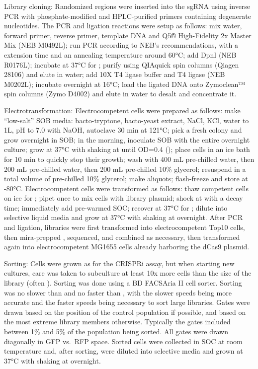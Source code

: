 \documentclass[10pt,oneside]{article}
\begin{document}
Library cloning: Randomized regions were inserted into the sgRNA using inverse PCR with phosphate-modified and HPLC-purified primers containing degenerate nucleotides.  The PCR and ligation reactions were setup as follows: mix  water,   forward primer,   reverse primer,   template DNA and  Q5® High-Fidelity 2x Master Mix (NEB M0492L); run PCR according to NEB's recommendations, with a  extension time and an annealing temperature around 60°C; add   DpnI (NEB R0176L); incubate at 37°C for ; purify using QIAquick spin columns (Qiagen 28106) and elute in  water; add  10X T4 ligase buffer and   T4 ligase (NEB M0202L); incubate overnight at 16°C; load the ligated DNA onto Zymoclean™ spin columns (Zymo D4002) and elute in  water to desalt and concentrate it.

Electrotransformation: Electrocompetent cells were prepared as follows: make ``low-salt'' SOB media:  bacto-tryptone,  bacto-yeast extract,   NaCl,   KCl, water to 1L, pH to 7.0 with NaOH, autoclave 30 min at 121°C; pick a fresh colony and grow overnight in  SOB; in the morning, inoculate  SOB with the entire overnight culture; grow at 37°C with shaking at  until OD=0.4 (); place cells in an ice bath for 10 min to quickly stop their growth; wash with 400 mL pre-chilled water, then 200 mL pre-chilled water, then 200 mL pre-chilled 10\% glycerol; resuspend in a total volume of  pre-chilled 10\% glycerol; make  aliquots; flash-freeze and store at -80°C.  Electrocompetent cells were transformed as follows: thaw competent cells on ice for ; pipet once to mix cells with   library plasmid; shock at  with a  decay time; immediately add  pre-warmed SOC; recover at 37°C for ; dilute into selective liquid media and grow at 37°C with shaking at  overnight.  After PCR and ligation, libraries were first transformed into electrocompetent Top10 cells, then mira-prepped \autocite{pronobis2016}, sequenced, and combined as necessary, then transformed again into electrocompetent MG1655 cells already harboring the dCas9 plasmid.

Sorting: Cells were grown as for the CRISPRi assay, but when starting new  cultures, care was taken to subculture at least 10x more cells than the size of the library (often ).  Sorting was done using a BD FACSAria II cell sorter.  Sorting was no slower than  and no faster than , with the slower speeds being more accurate and the faster speeds being necessary to sort large libraries.  Gates were drawn based on the position of the control population if possible, and based on the most extreme library members otherwise.  Typically the gates included between 1\% and 5\% of the population being sorted.  All gates were drawn diagonally in GFP vs.\ RFP space.  Sorted cells were collected in  SOC at room temperature and, after sorting, were diluted into selective media and grown at 37°C with shaking at  overnight.
\end{document}
